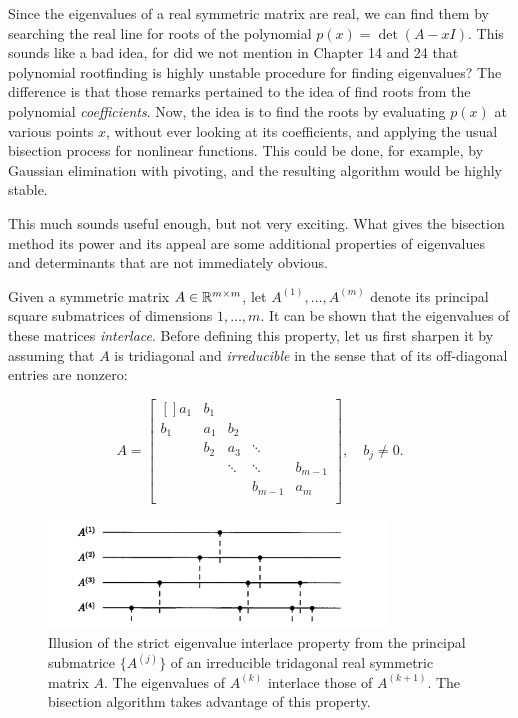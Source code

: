 Since the eigenvalues of a real symmetric matrix are real, we can find them by searching the real line for roots of the polynomial $ p(x) =\det(A-xI) $. This sounds like a bad idea, for did we not mention in Chapter 14 and 24 that polynomial rootfinding is highly unstable procedure for finding eigenvalues? The difference is that those remarks pertained to the idea of find roots from the polynomial {\it coefficients}.  Now, the idea is to find the roots by evaluating $ p(x) $ at various points $ x $, without ever looking at its coefficients, and applying the usual bisection process for nonlinear functions. This could be done, for example, by Gaussian elimination with pivoting, and the resulting algorithm would be highly stable.  

This much sounds useful enough, but not very exciting. What gives the bisection method its power and its appeal are some additional properties of eigenvalues and determinants that are not immediately obvious. 

Given a symmetric matrix $ A \in \mathbb{R}^{m \times  m} $, let $ A^{(1)}, \ldots , A^{(m)} $ denote its principal square submatrices of dimensions $ 1,\ldots ,m $. It can be shown that the eigenvalues of these matrices {\it interlace}.  Before defining this property, let us first sharpen it by assuming that $ A $ is tridiagonal and {\it irreducible} in the sense that of its off-diagonal entries are nonzero: 

\begin{equation}
\label{eq: irredicible tridiagonal matrice}
    A =\begin{bmatrix}[] 
        a_1 & b_1 &  &  &   \\
        b_1 & a_1 & b_2 &  &   \\
         & b_2 & a_3 & \ddots &   \\
         &  & \ddots & \ddots &  b_{m-1} \\
         &  &  & b_{m-1} &  a_m \\
    \end{bmatrix}, \quad b_j \neq 0.   
\end{equation}

\begin{figure}[H]
    \centering
    \includegraphics[width=0.8\textwidth]{figures/30-1.png}
    \caption{Illusion of the strict eigenvalue interlace property from the principal submatrice $ \{A^{(j)}\}  $ of an irreducible tridagonal real symmetric matrix $ A $. The eigenvalues of $ A^{(k)} $ interlace those of $ A^{(k+1)} $. The bisection algorithm takes advantage of this property. }
\end{figure}

